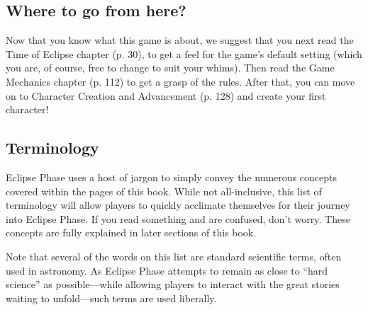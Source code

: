 \subsection{Where to go from here?}
\label{sec:where-go-from}

Now that you know what this game is about, we suggest that you next
read the Time of Eclipse chapter (p.  30), to get a feel for the
game's default setting (which you are, of course, free to change to
suit your whims). Then read the Game Mechanics chapter (p. 112) to get
a grasp of the rules. After that, you can move on to Character
Creation and Advancement (p. 128) and create your first character!

\subsection{Terminology}
\label{sec:terminology}

Eclipse Phase uses a host of jargon to simply convey the numerous
concepts covered within the pages of this book. While not
all-inclusive, this list of terminology will allow players to quickly
acclimate themselves for their journey into Eclipse Phase. If you read
something and are confused, don't worry. These concepts are fully
explained in later sections of this book.

Note that several of the words on this list are standard scientific
terms, often used in astronomy. As Eclipse Phase attempts to remain as
close to ``hard science'' as possible—while allowing players to interact
with the great stories waiting to unfold—such terms are used
liberally.


